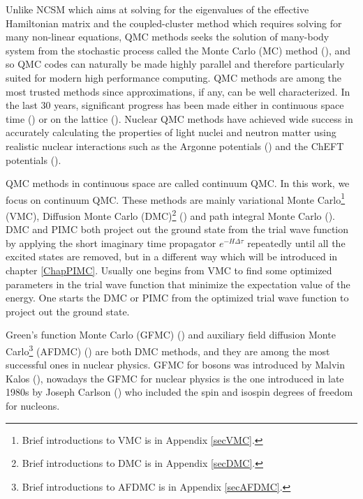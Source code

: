 \documentclass[12pt,letterpaper,UTF8]{report}
\begin{document}
Unlike NCSM which aims at solving for the eigenvalues of the effective Hamiltonian matrix and the coupled-cluster method which requires solving for many non-linear equations, QMC methods seeks the solution of many-body system from the stochastic process called the Monte Carlo (MC) method (\cite{Kalos1986a}), and so QMC codes can naturally be made highly parallel and therefore particularly suited for modern high performance computing.
QMC methods are among the most trusted methods since approximations, if any, can be well characterized.
In the last 30 years, significant progress has been made either in continuous space time (\cite{CarlsonRMP15a}) or on the lattice (\cite{LEE2009117,Lee2012PRL}). Nuclear QMC methods have achieved wide success in accurately calculating the properties of light nuclei and neutron matter using realistic nuclear interactions such as the Argonne potentials (\cite{Wiringa95PRC,WiringaPieper02a}) and the ChEFT potentials (\cite{Lynn14a,Gerzerlis14a,Lynn2017PRC,Lonardoni2018PRL,Lonardoni2018PRC}).

QMC methods in continuous space are called continuum QMC. In this work, we focus on continuum QMC.
These methods are mainly variational Monte Carlo\footnote{Brief introductions to VMC is in Appendix \ref{secVMC}.} (VMC), Diffusion Monte Carlo (DMC)\footnote{Brief introductions to DMC is in Appendix \ref{secDMC}.}  (\cite{HammondMCbook}) and path integral Monte Carlo (\cite{Ceperley95a}).
DMC and PIMC both project out the ground state from the trial wave function by applying the short imaginary time propagator $e^{-H\Delta \tau}$ repeatedly until all the excited states are removed, but in a different way which will be introduced in chapter \ref{ChapPIMC}.
Usually one begins from VMC to find some optimized parameters in the trial wave function that minimize the expectation value of the energy. One starts the DMC or PIMC from the optimized trial wave function to project out the ground state.

Green's function Monte Carlo (GFMC) (\cite{Carlson87a}) and auxiliary field diffusion Monte Carlo\footnote{Brief introductions to AFDMC is in Appendix \ref{secAFDMC}.} (AFDMC) (\cite{Schmidt99a}) are both DMC methods, and they are among the most successful ones in nuclear physics.
GFMC for bosons was introduced by Malvin Kalos (\cite{Kalos1974PRA}),
nowadays the GFMC for nuclear physics is the one introduced in late 1980s by Joseph Carlson (\cite{Carlson87a}) who included the spin and isospin degrees of freedom for nucleons.
\end{document}
